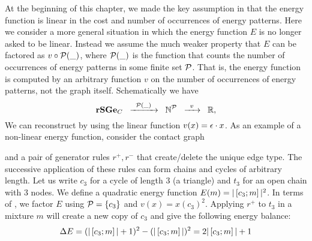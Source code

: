 At the beginning of this chapter,
we made the key assumption in 
that the energy function is linear
in the cost and number of occurrences of energy patterns.
Here we consider a more general situation
in which the energy function $E$ is no longer asked to be linear.
Instead we assume the much weaker property that $E$
can be factored as $v \circ \mathcal{P}(\_)$,
where $\mathcal{P}(\_)$ is the function that counts
the number of occurrences of energy patterns
in some finite set $\mathcal{P}$.
That is, the energy function is computed by
an arbitrary function $v$ on the number of occurrences
of energy patterns, not the graph itself.
Schematically we have
\begin{equation}
  \label{eq:factor}
  \mathbf{rSGe}_C \;\; \xrightarrow{\;\; \mathcal{P}(\_) \;\;} \;\;
  \mathbb{N}^{\mathcal{P}} \;\; \xrightarrow{\;\; v \;\;} \;\; \mathbb{R},
\end{equation}
We can reconstruct 
by using the linear function $v(x) = \epsilon \cdot x$.
As an example of a non-linear energy function,
consider the contact graph
\begin{center}
\end{center}
and a pair of generator rules $r^+,r^-$
that create/delete the unique edge type.
The successive application of these rules can form
chains and cycles of arbitrary length.
Let us write $c_3$ for a cycle of length $3$ (a triangle)
and $t_3$ for an open chain with $3$ nodes.
We define a quadratic energy function
$E(m) = |\left[c_3;m\right]|^2$.
In terms of ,
we factor $E$ using $\mathcal{P} = \left\{ c_3 \right\}$ and $v(x) = x(c_3)^2$.
Applying $r^+$ to $t_3$ in a mixture $m$
will create a new copy of $c_3$
and give the following energy balance:
\begin{equation}
  \label{eq:c3delta}
  \Delta E = (|\left[c_3;m\right]| + 1)^2 - (|\left[c_3;m\right]|)^2
           = 2|\left[c_3;m\right]| + 1
\end{equation}
